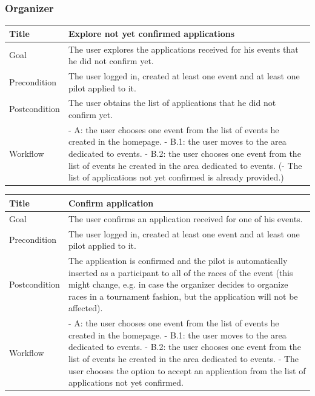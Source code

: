 \documentclass{beamer}
\begin{document}
\begin{frame}
    \frametitle{Organizer}
    \begin{table}
        \tiny
        \begin{tabular}{|p{2cm}|p{6cm}|}
        \hline
        Title & \textbf{Explore not yet confirmed applications} \\
        \hline
        Goal & The user explores the applications received for his events that he did not confirm yet. \\
        \hline
        Precondition & The user logged in, created at least one event and at least one pilot applied to it.\\
        \hline
        Postcondition & The user obtains the list of applications that he did not confirm yet. \\
        \hline
        Workflow &
        - A: the user chooses one event from the list of events he created in the homepage. \newline
        - B.1: the user moves to the area dedicated to events. \newline
        - B.2: the user chooses one event from the list of events he created in the area dedicated to events. \newline
        (- The list of applications not yet confirmed is already provided.) \\
        \hline
        \end{tabular}
\end{table}

\begin{table}
    \tiny
    \begin{tabular}{|p{2cm}|p{6cm}|}
    \hline
    Title & \textbf{Confirm application} \\
    \hline
    Goal & The user confirms an application received for one of his events. \\
    \hline
    Precondition & The user logged in, created at least one event and at least one pilot applied to it.\\
    \hline
    Postcondition & The application is confirmed and the pilot is automatically inserted as a participant
    to all of the races of the event (this might change, e.g. in case the organizer decides to organize races 
    in a tournament fashion, but the application will not be affected). \\
    \hline
    Workflow &
    - A: the user chooses one event from the list of events he created in the homepage. \newline
    - B.1: the user moves to the area dedicated to events. \newline
    - B.2: the user chooses one event from the list of events he created in the area dedicated to events. \newline
    - The user chooses the option to accept an application from the list of applications not yet confirmed. \\
    \hline
    \end{tabular}
\end{table}

\end{frame}
\end{document}
